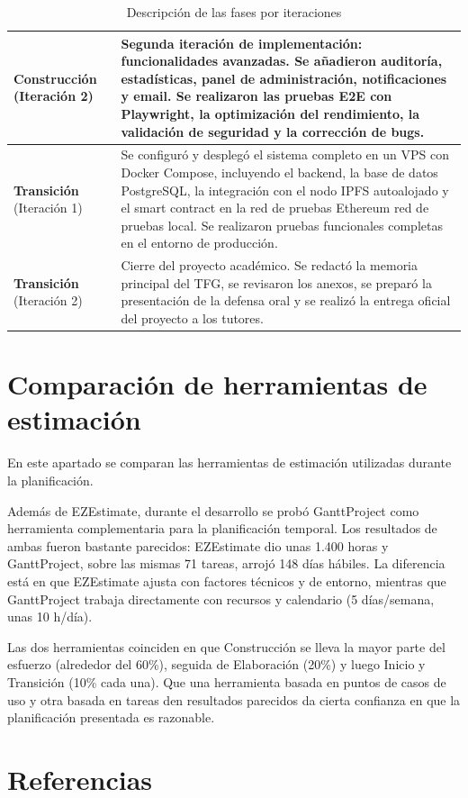\documentclass[11pt, a4paper]{article}
\begin{document}
\begin{table}[H]
\begin{tabular}{|p{4cm}|p{10cm}|}
\hline
\textbf{Construcción} (Iteración 2) &
Segunda iteración de implementación: funcionalidades avanzadas. Se añadieron auditoría, estadísticas, panel de administración, notificaciones y email. Se realizaron las pruebas E2E con Playwright, la optimización del rendimiento, la validación de seguridad y la corrección de bugs. \\
\hline
\textbf{Transición} (Iteración 1) &
Se configuró y desplegó el sistema completo en un VPS con Docker Compose, incluyendo el backend, la base de datos PostgreSQL, la integración con el nodo IPFS autoalojado y el smart contract en la red de pruebas Ethereum red de pruebas local. Se realizaron pruebas funcionales completas en el entorno de producción. \\
\hline
\textbf{Transición} (Iteración 2) &
Cierre del proyecto académico. Se redactó la memoria principal del TFG, se revisaron los anexos, se preparó la presentación de la defensa oral y se realizó la entrega oficial del proyecto a los tutores. \\
\hline
\end{tabular}
\caption{Descripción de las fases por iteraciones}\label{tab:fases-descripcion}
\end{table}

\section{Comparación de herramientas de estimación}

En este apartado se comparan las herramientas de estimación utilizadas durante la planificación.

Además de EZEstimate, durante el desarrollo se probó GanttProject como herramienta complementaria para la planificación temporal. Los resultados de ambas fueron bastante parecidos: EZEstimate dio unas 1.400 horas y GanttProject, sobre las mismas 71 tareas, arrojó 148 días hábiles. La diferencia está en que EZEstimate ajusta con factores técnicos y de entorno, mientras que GanttProject trabaja directamente con recursos y calendario (5 días/semana, unas 10 h/día).

Las dos herramientas coinciden en que Construcción se lleva la mayor parte del esfuerzo (alrededor del 60\%), seguida de Elaboración (20\%) y luego Inicio y Transición (10\% cada una). Que una herramienta basada en puntos de casos de uso y otra basada en tareas den resultados parecidos da cierta confianza en que la planificación presentada es razonable.

\section*{Referencias}
\end{document}
